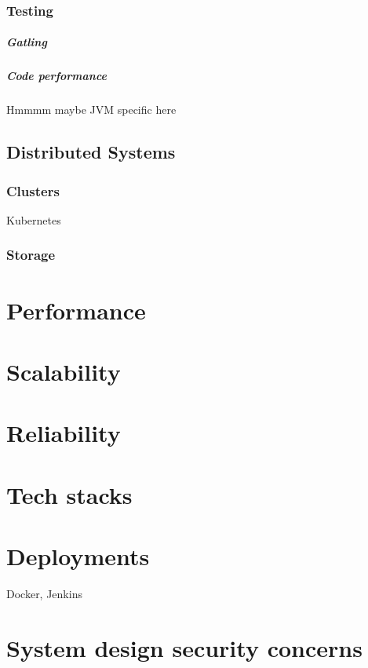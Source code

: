 \documentclass[a4paper, 11pt]{book}
\begin{document}
    \subsection{Testing}

    \paragraph{Gatling}

    \paragraph{Code performance}
    Hmmmm maybe JVM specific here


    \section{Distributed Systems}

    \subsection{Clusters}
    Kubernetes

    \subsection{Storage}


    \chapter{Performance}


    \chapter{Scalability}


    \chapter{Reliability}


    \chapter{Tech stacks}


    \chapter{Deployments}
    Docker, Jenkins


    \chapter{System design security concerns}
\end{document}

